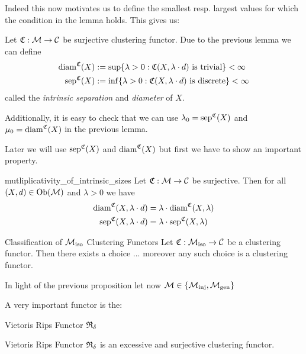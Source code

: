 Indeed this now motivates us to define the smallest resp. largest values for which the condition in the lemma holds. This gives us:

\begin{definition}{}{}
Let $\mathfrak{C}: \mathcal{M} \to \mathcal{C}$ be surjective clustering functor. Due to the previous lemma we can define
\begin{align*}
\mathrm{diam}^{\mathfrak{C}}(X) &:= \sup\{ \lambda > 0: \mathfrak{C}(X,\lambda \cdot d) \text{ is trivial}\} < \infty\\
\mathrm{sep}^{\mathfrak{C}}(X) &:= \inf\{ \lambda > 0: \mathfrak{C}(X,\lambda \cdot d) \text{ is discrete}\} < \infty
\end{align*}
called the \emph{intrinsic separation} and \emph{diameter} of $X$. 
\end{definition}
Additionally, it is easy to check that we can use $\lambda_0 = \mathrm{sep}^{\mathfrak{C}}(X)$ and $\mu_0 = \mathrm{diam}^{\mathfrak{C}}(X)$ in the previous lemma.

Later we will use $\mathrm{sep}^{\mathfrak{C}}(X)$ and $\mathrm{diam}^{\mathfrak{C}}(X)$ but first we have to show an important property.

\begin{lemma}{}{mutliplicativity_of_intrinsic_sizes}
Let $\mathfrak{C}: \mathcal{M} \to \mathcal{C}$ be surjective. Then for all $(X,d) \in \mathrm {Ob}(\mathcal{M})$ and $\lambda > 0$ we have
\begin{align*}{}{}
    \mathrm{diam}^{\mathfrak{C}}(X,\lambda \cdot d) &= \lambda \cdot \mathrm{diam}^{\mathfrak{C}}(X,\lambda) \\
    \mathrm{sep}^{\mathfrak{C}}(X,\lambda \cdot d) &= \lambda \cdot \mathrm{sep}^{\mathfrak{C}}(X,\lambda)
\end{align*}
\end{lemma}

\begin{proposition}{Classification of ${\mathcal{M}_\mathrm{iso}}$ Clustering Functors}{}
Let $\mathfrak{C}: {\mathcal{M}_\mathrm{iso}} \to \mathcal{C}$ be a clustering functor. Then there exists a choice ... moreover any such choice is a clustering functor.
\end{proposition}
In light of the previous proposition let now $\mathcal{M} \in \{{\mathcal{M}_\mathrm{inj}}, {\mathcal{M}_\mathrm{gen}}\}$


A very important functor is the:
\begin{definition}{Vietoris Rips Functor}{}
$\mathfrak{R}_\delta$
\end{definition}




\begin{proposition}{Vietoris Rips Functor}{}
$\mathfrak{R}_\delta$ is an excessive and surjective clustering functor.
\end{proposition}

